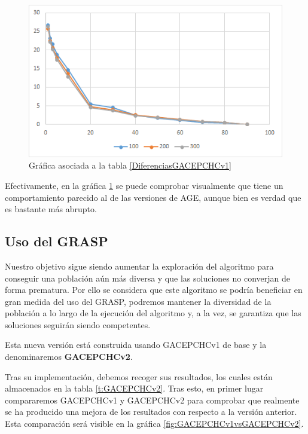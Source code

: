 \begin{figure}[h]
		\centering
		\includegraphics[scale=1]{imagenes/Experimental/DiferenciasGACEPCHCv1.png}
        \caption{Gráfica asociada a la tabla \ref{DiferenciasGACEPCHCv1}}
        \label{fig:DiferenciasGACEPCHCv1}
\end{figure}

Efectivamente, en la gráfica \ref{fig:DiferenciasGACEPCHCv1} se puede comprobar visualmente que tiene un comportamiento parecido al de las versiones de AGE, aunque bien es verdad que es bastante más abrupto.

\subsection{Uso del GRASP}

Nuestro objetivo sigue siendo aumentar la exploración del algoritmo para conseguir una población aún más diversa y que las soluciones no converjan de forma prematura. 
Por ello se considera que este algoritmo se podría beneficiar en gran medida del uso del GRASP, podremos mantener la diversidad de la población a lo largo de la ejecución del algoritmo y, a la vez, se garantiza que las soluciones seguirán siendo competentes. 

Esta nueva versión está construida usando GACEPCHCv1 de base y la denominaremos \textbf{GACEPCHCv2}.

Tras su implementación, debemos recoger sus resultados, los cuales están almacenados en la tabla \ref{t:GACEPCHCv2}. 
Tras esto, en primer lugar compararemos GACEPCHCv1 y GACEPCHCv2 para comprobar que realmente se ha producido una mejora de los resultados con respecto a la versión anterior. 
Esta comparación será visible en la gráfica \ref{fig:GACEPCHCv1vsGACEPCHCv2}.

